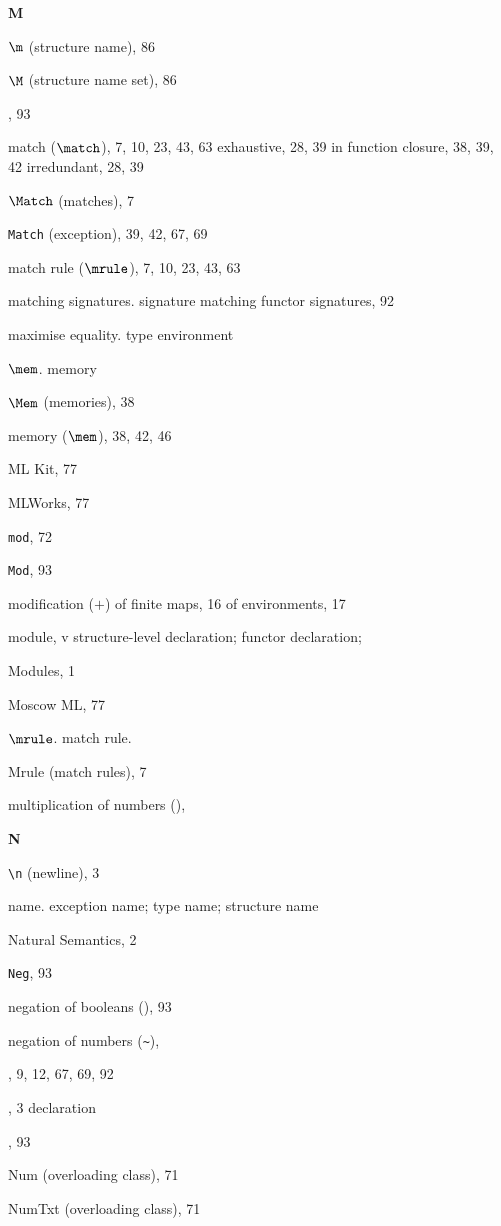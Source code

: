 \begin{theindex}
\parbox{65mm}{\hfil{\large\bf M}\hfil}

\indexspace

\item $\m$ (structure name), 86
\item $\M$ (structure name set), 86
\item {}, 93
\item match ($\match$), 7, 10, 23, 43, 63
\subitem exhaustive, 28, 39
\subitem in function closure, 38, 39, 42
\subitem irredundant, 28, 39
\item $\Match$ (matches), 7
\item {\tt Match} (exception), 39, 42, 67, 69
\item match rule ($\mrule$), 7, 10, 23, 43, 63
\item matching
\subitem signatures. \see signature matching
\subitem functor signatures, 92
\item maximise equality. \see type environment
\item $\mem$. \see memory
\item $\Mem$ (memories), 38
\item memory ($\mem$), 38, 42, 46
\item ML Kit, 77
\item MLWorks, 77
\item {\tt mod}, 72
\item {\tt Mod}, 93
\item modification ($+$)
\subitem of finite maps, 16
\subitem of environments, 17
\item module, v
\subitem \seealso structure-level declaration; functor declaration;
\item Modules, 1
\item Moscow ML, 77
\item $\mrule$.  \see match rule.
\item Mrule (match rules), 7
\item multiplication of numbers (\ml{*}), \mulrefs
\indexspace

\parbox{65mm}{\hfil{\large\bf N}\hfil}

\indexspace
\item \verb+\n+ (newline), 3
\item name. \see exception name; type name; structure name
\item Natural Semantics, 2
\item {\tt Neg}, 93
\item negation of booleans (), 93
\item negation of numbers (\verb+~+), \unaryminusrefs
\item \NIL, 9, 12, 67, 69, 92
\item \NONFIX, 3
\subitem \seealso declaration
\item {}, 93
\item Num (overloading class), 71
\item NumTxt (overloading class), 71
\indexspace


\end{theindex}
